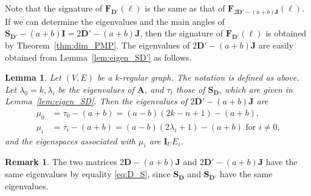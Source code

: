\documentclass[a4paper, 11pt]{article}
\newcommand{\A}{\boldsymbol{A}}
\newcommand{\J}{\boldsymbol{J}}
\newcommand{\I}{\boldsymbol{I}}
\newcommand{\D}{\boldsymbol{D}}
\newcommand{\F}{\boldsymbol{F}}
\newcommand{\Sm}{\boldsymbol{S}}
\newcommand{\el}{\boldsymbol{\ell}}
\newtheorem{lemma}[theorem]{Lemma}
\theoremstyle{definition}
\newtheorem{remark}[theorem]{Remark}
\begin{document}
Note that the signature of $\F_{\D'}(\el)$ is the same as that of $\F_{2\D'-(a+b)\J}(\el)$.
If we can determine the eigenvalues and the main angles of $\Sm_{\D'}-(a+b)\I=2\D'-(a+b)\J$, 
then the signature of $\F_{\D'}(\el)$ is obtained by Theorem~\ref{thm:dim_PMP}. 
The eigenvalues of $2\D'-(a+b)\J$ are easily obtained from Lemma~\ref{lem:eigen_SD'} as follows. 
\begin{lemma} \label{lem:eigen_2D'}
Let $(V,E)$ be a $k$-regular graph. The notation is defined as above. 
Let $\lambda_0=k,\lambda_i$ be the eigenvalues of $\A$, 
and $\tau_i$ those of $\Sm_{\D}$, which are given in  Lemma~\ref{lem:eigen_SD}. 
Then the eigenvalues of $2\D'-(a+b)\J$ are  
\begin{align*}%
\mu_0&=\tau_0-(a+b)=(a-b)(2k-n+1)-(a+b),\\ %
\mu_i&=\tau_i-(a+b)=(a-b)(2\lambda_i+1)-(a+b) \text{ for $i\ne 0$,}
\end{align*}
 and the eigenspaces associated with $\mu_i$ are $\I_U E_i$. 
\end{lemma}
\begin{remark} \label{rem:two_D}
    The two matrices $2\D - (a+b)\J$ and $2\D' - (a+b)\J$ have the same eigenvalues by equality \eqref{eq:D_S}, since $\Sm_{\D}$ and $\Sm_{\D'}$ have the same eigenvalues. 
\end{remark}
\end{document}
